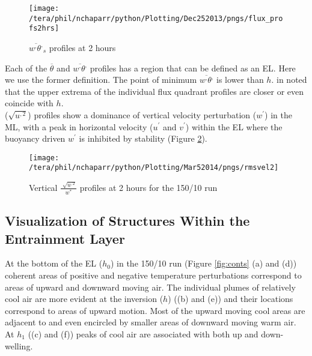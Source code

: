 \begin{figure}[htbp]
    \centering
    \texttt{[image: /tera/phil/nchaparr/python/Plotting/Dec252013/pngs/flux\_profs2hrs]}
    \caption{$\overline{w^{,}\theta^{,}}_{s}$ profiles at 2 hours}
    \label{fig:fluxprofs2hrs}   %
\end{figure}

Each of the $\overline{\theta}$ and $\overline{w^{,}\theta^{,}}$ profiles has a region that can be defined as an \acs{EL}.
Here we use the former definition.  The point of minimum $\overline{w^{,}\theta^{,}}$ is lower than $h$.  
\citeauthor{SullMoengStev} in \cite{SullMoengStev} noted that the upper extrema of the individual flux quadrant profiles 
are closer or even coincide with $h$.\\

($\sqrt{u^{,2}}$) profiles show a dominance of vertical velocity perturbation ($w^{'}$) in the \acs{ML}, with a peak in horizontal velocity
($u^{'}$ and $v^{'}$) within the \acs{EL} where the buoyancy driven $w^{'}$ is inhibited by stability (Figure \ref{fig:rmsvel150102hrs}). \\

\begin{figure}[htbp]
    \centering
    \texttt{[image: /tera/phil/nchaparr/python/Plotting/Mar52014/pngs/rmsvel2]}
    \caption{Vertical $\frac{\sqrt[]{u^{,2}}}{w^{*}}$ profiles at 2 hours for the 150/10 run}
    \label{fig:rmsvel150102hrs}   %
\end{figure}

\clearpage

\subsection{Visualization of Structures Within the Entrainment Layer}
\FloatBarrier
At the bottom of the \acs{EL} ($h_{0}$) in the 150/10 run (Figure \ref{fig:conts} (a) and (d)) coherent
areas of positive and negative temperature perturbations correspond to areas of upward and downward moving air.  
The individual plumes of relatively cool air are more evident at the inversion ($h$) ((b) and (e)) and their 
locations correspond to areas of upward motion.  Most of the upward moving cool areas are adjacent to and even 
encircled by smaller areas of downward moving warm air.  At $h_{1}$ ((c) and (f)) peaks of cool air are associated 
with both up and down-welling.\\  

